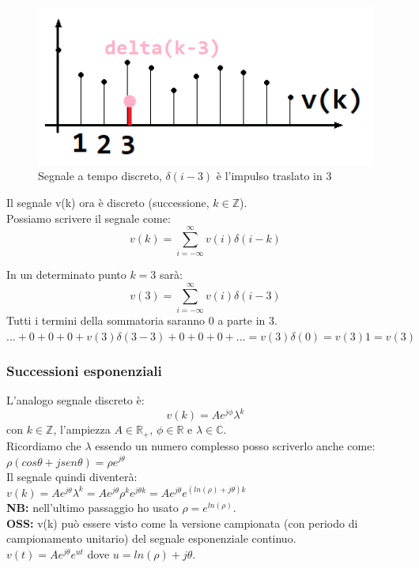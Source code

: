 	\begin{figure}[h]
		\centering
		\includegraphics[scale=0.5]{immagini/campionamentoDiscreto}
		\caption{ Segnale a tempo discreto, $\delta(i-3)$ è l'impulso traslato in 3}
		\label{fig: campionamentoDiscreto}
	\end{figure}
	
	Il segnale v(k) ora è discreto (successione, $ k \in \mathbb{Z}$).\\
	Possiamo scrivere il segnale come:\\
	\begin{equation*}
	v(k)= \sum_{i=-\infty}^{ \infty} v(i) \delta(i-k)
	\end{equation*}
	
	In un determinato punto $ k=3$ sarà:\\
	\begin{equation*}
	v(3)= \sum_{i=-\infty}^{ \infty} v(i) \delta(i-3)
	\end{equation*}
	Tutti i termini della sommatoria saranno 0 a parte in 3.\\
	$ ...+0+0+0+ v(3) \delta(3-3)+0+0+0+...= v(3) \delta(0) = v(3)1 = v(3)$

\subsubsection{Successioni esponenziali}

	L'analogo segnale discreto è:
	\begin{equation*}
	v(k)= Ae^{j \phi} \lambda^k
	\end{equation*}
	con $ k \in \mathbb{Z} $, l'ampiezza $ A \in \mathbb{R}_+ $, $ \phi \in \mathbb{R} $ e $ \lambda \in \mathbb{C}$.\\
	
	Ricordiamo che $ \lambda $ essendo un numero complesso posso scriverlo anche come:\\
	 $ \rho ( cos\theta + j sen\theta) = \rho e^{j \theta} $\\
	Il segnale quindi diventerà:\\
	$ v(k)= Ae^{j \theta} \lambda^k = Ae^{j \theta} \rho^{k} e^{j \theta k} = Ae^{j \theta} e^{ (ln(\rho)+j\theta) k} $\\
	\textbf{NB:} nell'ultimo passaggio ho usato $ \rho = e^{ln(\rho)}$.\\
	\textbf{OSS:} v(k) può essere visto come la versione campionata (con periodo di campionamento unitario) del segnale esponenziale continuo.\\
	$ v(t) = Ae^{j \theta} e^{ ut} $ dove $ u=ln( \rho)+j \theta $.\\
	

